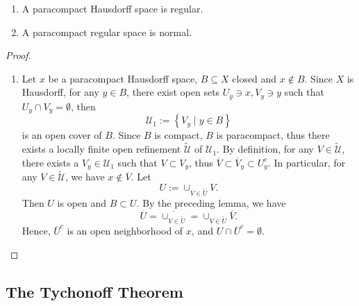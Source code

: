 \begin{proposition}
  \begin{enumerate}
    \item A paracompact Hausdorff space is regular.
    \item A paracompact regular space is normal.
  \end{enumerate}
\end{proposition}
\begin{proof}
  \begin{enumerate}
    \item Let \( x \) be a paracompact Hausdorff space, \( B \subseteq X \) closed and \( x \notin B \).
      Since \( X \) is Hausdorff, for any \( y \in B \), there exist open sets \( U_y \ni x, V_y \ni y \) such that \( U_y \cap V_y = \emptyset \), then
      \[
        \mathcal{U}_1 := \left\lbrace V_y \mid y \in B \right\rbrace
      \]
      is an open cover of \( B \).
      Since \( B \) is compact, \( B \) is paracompact, thus there exists a locally finite open refinement \( \widetilde{\mathcal{U}} \) of \( \mathcal{U}_1 \).
      By definition, for any \( V \in \widetilde{\mathcal{U}} \), there exists a \( V_y \in \mathcal{U}_1 \) such that \( V \subset V_y \), thus \( \overline{V} \subset \overline{V}_y \subset U^c_y \).
      In particular, for any \( V \in \widetilde{\mathcal{U}} \), we have \( x \notin \overline{V} \).
      Let
      \[
        U := \cup_{V \in \widetilde{U}}V.
      \]
      Then \( U \) is open and \( B \subset U \).
      By the preceding lemma, we have
      \[
        \overline{U} = \overline{\cup_{V \in \widetilde{U}}} = \cup_{V \in \widetilde{U}} \overline{V}.
      \]
      Hence, \( {\overline{U}}^c \) is an open neighborhood of \( x \), and \( U \cap {\overline{U}}^c = \emptyset \).
  \end{enumerate}
\end{proof}

\subsection{The Tychonoff Theorem}

